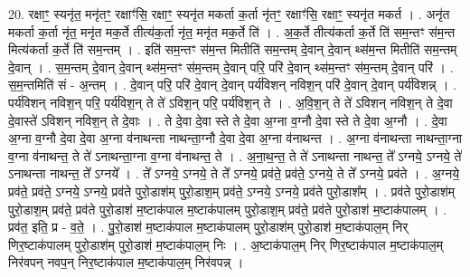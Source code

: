 \documentclass[17pt]{extarticle}
\begin{document}
20. रक्षाꣳ॒॒ स्यनृ॑त॒ मनृ॑तꣳ॒॒ रक्षाꣳ॑सि॒ रक्षाꣳ॒॒ स्यनृ॑त मकर्ता क॒र्ता नृ॑तꣳ॒॒ रक्षाꣳ॑सि॒ रक्षाꣳ॒॒ स्यनृ॑त मकर्त । . अनृ॑त मकर्ता क॒र्ता नृ॑त॒ मनृ॑त मक॒र्ते तीत्य॑क॒र्ता नृ॑त॒ मनृ॑त मक॒र्ते ति॑ । . अ॒क॒र्ते तीत्य॑कर्ता क॒र्ते ति॑ सम॒न्तꣳ स॑म॒न्त मित्य॑कर्ता क॒र्ते ति॑ सम॒न्तम् । . इति॑ सम॒न्तꣳ स॑म॒न्त मितीति॑ सम॒न्तम् दे॒वान् दे॒वान् थ्स॑म॒न्त मितीति॑ सम॒न्तम् दे॒वान् । . स॒म॒न्तम् दे॒वान् दे॒वान् थ्स॑म॒न्तꣳ स॑म॒न्तम् दे॒वान् परि॒ परि॑ दे॒वान् थ्स॑म॒न्तꣳ स॑म॒न्तम् दे॒वान् परि॑ । . स॒म॒न्तमिति॑ सं - अ॒न्तम् । . दे॒वान् परि॒ परि॑ दे॒वान् दे॒वान् पर्य॑विशन् नविश॒न् परि॑ दे॒वान् दे॒वान् पर्य॑विशन्न् । . पर्य॑विशन् नविश॒न् परि॒ पर्य॑विश॒न् ते ते॑ ऽविश॒न् परि॒ पर्य॑विश॒न् ते । . अ॒वि॒श॒न् ते ते॑ ऽविशन् नविश॒न् ते दे॒वा दे॒वास्ते॑ ऽविशन् नविश॒न् ते दे॒वाः । . ते दे॒वा दे॒वा स्ते ते दे॒वा अ॒ग्ना व॒ग्नौ दे॒वा स्ते ते दे॒वा अ॒ग्नौ । . दे॒वा अ॒ग्ना व॒ग्नौ दे॒वा दे॒वा अ॒ग्ना व॑नाथन्ता नाथन्ता॒ग्नौ दे॒वा दे॒वा अ॒ग्ना व॑नाथन्त । . अ॒ग्ना व॑नाथन्ता नाथन्ता॒ग्ना व॒ग्ना व॑नाथन्त॒ ते ते॑ ऽनाथन्ता॒ग्ना व॒ग्ना व॑नाथन्त॒ ते । . अ॒ना॒थ॒न्त॒ ते ते॑ ऽनाथन्ता नाथन्त॒ ते᳚ ऽग्नये॒ ऽग्नये॒ ते॑ ऽनाथन्ता नाथन्त॒ ते᳚ ऽग्नये᳚ । . ते᳚ ऽग्नये॒ ऽग्नये॒ ते ते᳚ ऽग्नये॒ प्रव॑ते॒ प्रव॑ते॒ ऽग्नये॒ ते ते᳚ ऽग्नये॒ प्रव॑ते । . अ॒ग्नये॒ प्रव॑ते॒ प्रव॑ते॒ ऽग्नये॒ ऽग्नये॒ प्रव॑ते पुरो॒डाश॑म् पुरो॒डाश॒म् प्रव॑ते॒ ऽग्नये॒ ऽग्नये॒ प्रव॑ते पुरो॒डाश᳚म् । . प्रव॑ते पुरो॒डाश॑म् पुरो॒डाश॒म् प्रव॑ते॒ प्रव॑ते पुरो॒डाश॑ म॒ष्टाक॑पाल म॒ष्टाक॑पालम् पुरो॒डाश॒म् प्रव॑ते॒ प्रव॑ते पुरो॒डाश॑ म॒ष्टाक॑पालम् । . प्रव॑त॒ इति॒ प्र - व॒ते॒ । . पु॒रो॒डाश॑ म॒ष्टाक॑पाल म॒ष्टाक॑पालम् पुरो॒डाश॑म् पुरो॒डाश॑ म॒ष्टाक॑पाल॒म् निर् णिर॒ष्टाक॑पालम् पुरो॒डाश॑म् पुरो॒डाश॑ म॒ष्टाक॑पाल॒म् निः । . अ॒ष्टाक॑पाल॒म् निर् णिर॒ष्टाक॑पाल म॒ष्टाक॑पाल॒म् निर॑वपन् नवप॒न् निर॒ष्टाक॑पाल म॒ष्टाक॑पाल॒म् निर॑वपन्न् । \newline
\end{document}
